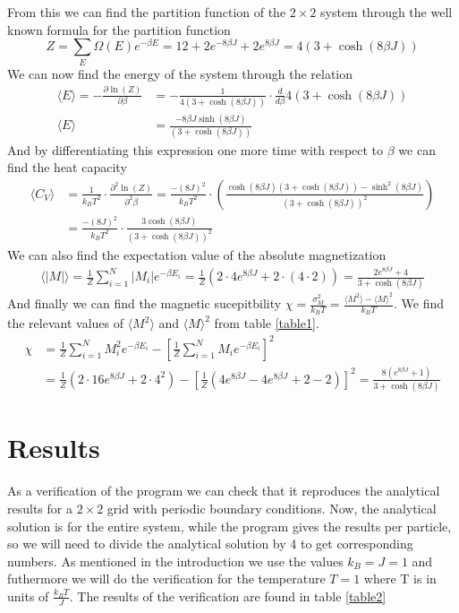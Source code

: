 \documentclass[a4paper,english, 10pt, twoside]{article}
\begin{document}
From this we can find the partition function of the $2\times2$ system through the well known formula for the partition function
$$
Z = \sum\limits_E \Omega(E)e^{-\beta E} = 12 + 2e^{-8\beta J} + 2e^{8\beta J} = 4\left(3+\cosh(8\beta J)\right)
$$
We can now find the energy of the system through the relation 
\begin{align*}
 \langle E\rangle = -\frac{\partial \ln\left(Z\right)}{\partial \beta} &= -\frac{1}{4\left(3+\cosh(8\beta J)\right)}\cdot \frac{d}{d\beta}4\left(3+\cosh(8\beta J)\right)\\
 \langle E\rangle &= \frac{-8\beta J \sinh(8\beta J)}{\left(3+\cosh(8\beta J)\right)}
\end{align*}
And by differentiating this expression one more time with respect to $\beta$ we can find the heat capacity
\begin{align*}
 \langle C_V\rangle&= \frac{1}{k_BT^2}\cdot\frac{\partial^2 \ln\left(Z\right)}{\partial^2 \beta} = \frac{-(8J)^2}{k_BT^2}\cdot
 \left(\frac{\cosh(8\beta J)(3+\cosh(8\beta J)) - \sinh^2(8\beta J)}{(3+\cosh(8\beta J))^2}\right)\\
 &= \frac{-(8J)^2}{k_BT^2}\cdot\frac{3\cosh(8\beta J)}{(3+\cosh(8\beta J))^2}
\end{align*}
We can also find the expectation value of the absolute magnetization
\begin{align*}
 \langle |M|\rangle = \frac{1}{Z}\sum\limits_{i=1}^N |M_i|e^{-\beta E_i} = \frac{1}{Z}\left(2\cdot4e^{8\beta J} + 2\cdot (4\cdot 2)\right)
  = \frac{2e^{8\beta J} + 4}{3+\cosh(8\beta J)}
\end{align*}
And finally we can find the magnetic sucepitbility $\chi = \frac{\sigma_M^2}{k_BT} = \frac{\langle M^2\rangle -
\langle M \rangle^2}{k_BT}$. We find the relevant values of $\langle M^2\rangle$ and $\langle M \rangle^2$ from table 
\ref{table1}.
\begin{align*}
\chi &= \frac{1}{Z}\sum\limits_{i=1}^N M_i^2e^{-\beta E_i} -\left[\frac{1}{Z}\sum\limits_{i=1}^N M_ie^{-\beta E_i}\right]^2\\
 &= \frac{1}{Z}\left(2\cdot 16e^{8\beta J} + 2\cdot 4^2 \right) - \left[\frac{1}{Z}\left(4e^{8\beta J}-4e^{8\beta J} + 
 2-2 \right)\right]^2 = \frac{8(e^{8\beta J} + 1)}{3+\cosh(8\beta J)}
\end{align*}

\section*{Results}
As a verification of the program we can check that it reproduces the analytical results for a $2\times 2$ grid with periodic 
boundary conditions. Now, the analytical solution is for the entire system, while the program gives the results per particle, so 
we will need to divide the analytical solution by 4 to get corresponding numbers. As mentioned in the introduction we use the 
values $k_B = J = 1$ and futhermore we will do the verification for the temperature $T = 1$ where T is in units of 
$\frac{k_B T}{J}$. The results of the verification are found in table \ref{table2}
\end{document}

